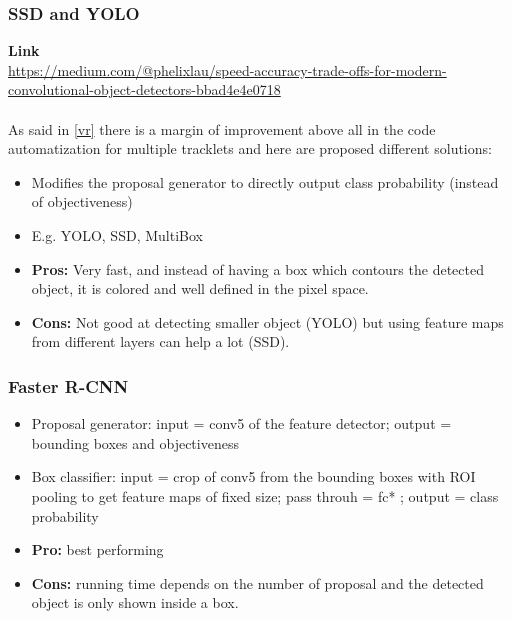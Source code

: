 \documentclass[11pt]{article}
\begin{document}
\begin{enumerate}
\subsubsection{SSD and YOLO}
\textbf{Link}\\
\url{https://medium.com/@phelixlau/speed-accuracy-trade-offs-for-modern-convolutional-object-detectors-bbad4e4e0718}\\\\
As said in \ref{vr} there is a margin of improvement above all in the code automatization for multiple tracklets and here are proposed different solutions:
\begin{itemize}
    \item Modifies the proposal generator to directly output class probability (instead of objectiveness)
    \item E.g. YOLO, SSD, MultiBox
    \item \textbf{Pros: } Very fast, and instead of having a box which contours the detected object, it is colored and well defined in the pixel space.
     \item \textbf{Cons:} Not good at detecting smaller object (YOLO) but using feature maps from different layers can help a lot (SSD).
\end{itemize}{}
\subsubsection{Faster R-CNN}
\begin{itemize}
    \item     Proposal generator: input = conv5 of the feature detector; output = bounding boxes and objectiveness
    \item Box classifier: input = crop of conv5 from the bounding boxes with ROI pooling to get feature maps of fixed size; pass throuh = fc* ; output = class probability
    \item \textbf{Pro:} best performing
    \item \textbf{Cons: } running time depends on the number of proposal and the detected object is only shown inside a box.
\end{itemize}{}


\end{enumerate}
\end{document}
